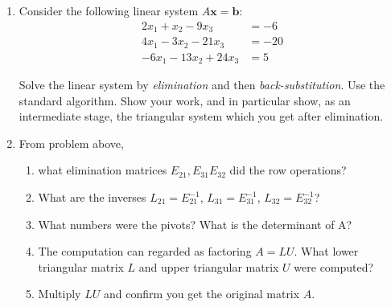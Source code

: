 \documentclass[11pt,fleqn]{article}
\newcommand{\bb}{\mathbf{b}}
\newcommand{\bx}{\mathbf{x}}
\begin{document}
\begin{enumerate}
\begin{enumerate}
	\item  What is the solution of the system in part \textbf{(i)}?
\vspace{1.0in}
	\end{enumerate}


\item  Consider the following linear system $A\bx = \bb$:
\begin{align*}
2 x_1 + x_2 - 9 x_3 &= -6 \\
4 x_1 - 3 x_2 -21 x_3 &= -20 \\
-6 x_1 - 13 x_2 + 24 x_3 &= 5
\end{align*}

Solve the linear system by \emph{elimination} and then \emph{back-substitution}.  Use the standard algorithm.  Show your work, and in particular show, as an intermediate stage, the triangular system which you get after elimination.
\vfill


\vspace{3in}
\item  From problem above, 
	\begin{enumerate} 
	\item what elimination matrices $E_{21},E_{31}E_{32}$ did the row operations?
	\vfill

	\item  What are the inverses $L_{21}=E_{21}^{-1}$, $L_{31}=E_{31}^{-1}$, $L_{32}=E_{32}^{-1}$?
	\vfill

	\item  What numbers were the pivots?  What is the determinant of A?
	\vfill

	\item  The computation can regarded as factoring $A=LU$.  What lower triangular matrix $L$ and upper triangular matrix $U$ were computed?
\vfill

	\item   Multiply $LU$ and confirm you get the original matrix $A$.
\vspace{0.5in}
	\end{enumerate}


\end{enumerate}
\end{document}
